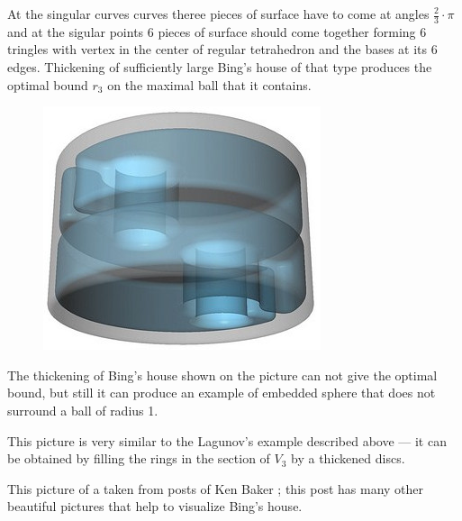 At the singular curves curves theree pieces of surface have to come at angles $\tfrac23\cdot\pi$ and at the sigular points 6 pieces of surface should come together forming 6 tringles with vertex in the center of regular tetrahedron and the bases at its 6 edges.
Thickening of sufficiently large Bing's house of that type produces the optimal bound $r_3$ on the maximal ball that it contains.

\begin{figure}
\vskip-0mm
\centering
\includegraphics[scale=.45]{pics/thickened-bing's-house}
\vskip-0mm
\end{figure}

The thickening of Bing's house shown on the picture can not give the optimal bound,
but still it can produce an example of embedded sphere that does not surround a ball of radius 1.

This picture is very similar to the Lagunov's example described above --- it can be obtained by filling the rings in the section of $V_3$ by a thickened discs. 

This picture of a taken from posts of Ken Baker \cite{baker};
this post has many other beautiful pictures that help to visualize Bing's house.

